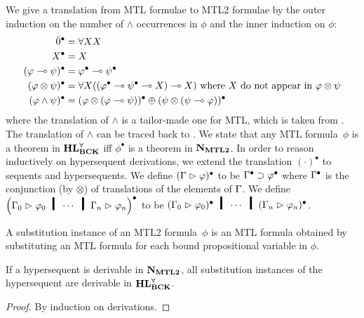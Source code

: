 \documentclass[envcountsame]{llncs}
\begin{document}
We give a translation from MTL formulae to MTL2 formulae by the
outer
induction on the number of $\wedge$ occurrences in $\phi$
and the inner induction on $\phi$:
\begin{align}
 \bar{0}^\bullet &= \forall XX \nonumber\\
 X^\bullet &= X \nonumber\\
 (\varphi\multimap\psi)^\bullet &= \varphi^\bullet \multimap \psi^\bullet\nonumber\\
 (\varphi\otimes\psi)^\bullet & = \forall
 X((\varphi^\bullet\multimap\psi^\bullet\multimap X)\multimap X) \text{ where }X\text{ do
 not appear in }\varphi\otimes\psi\nonumber\\
 (\varphi\land \psi)^\bullet &=
 (\varphi\otimes(\varphi\multimap\psi))^\bullet\oplus
 (\psi\otimes(\psi\multimap\varphi))^\bullet \label{eq:abb}
\end{align}
where the translation of $\wedge$ is a tailor-made one for MTL,
 which is taken from \citep[p.~48]{handbook:fuzzy}.  The translation of $\wedge$
can be traced back to \citet[Lem.~6.5]{Cintula200740}.
We state that any MTL formula~$\phi$ is a theorem in $\mathbf{HL}^\forall_{\mathbf{BCK}}$ iff
 $\phi^\bullet$ is a theorem in $\mathbf{N}_{\mathbf{MTL2}}$.
 In order to reason inductively on hypersequent derivations, we extend
 the translation $(\cdot)^\bullet$ to sequents and hypersequents.
 We define $(\Gamma\vartriangleright\varphi)^\bullet$ to be $\Gamma^\bullet\supset\varphi^\bullet$
 where
 $\Gamma^\bullet$ is the conjunction (by $\otimes$) of translations of the
 elements of $\Gamma$.
 We define
 $\left(\G_0\tr\phi_0\hmid\cdots\hmid\G_n\tr\phi_n\right)^\bullet$ to be
 $(\G_0\tr\phi_0)^\bullet\hmid\cdots \hmid (\G_n\tr\phi_n)^\bullet$.

A substitution instance of an MTL2 formula~$\phi$ is an MTL formula obtained by
substituting an MTL formula for each bound propositional variable in $\phi$.
 \begin{proposition}
  \label{prop:sound-ind}
  If a hypersequent is derivable in $\mathbf{N}_{\mathbf{MTL2}}$, all substitution instances
  of the hypersequent are derivable in $\mathbf{HL}^\forall_{\mathbf{BCK}}$.
 \end{proposition}
  \begin{proof}
   By induction on derivations.
  \end{proof}
\end{document}
